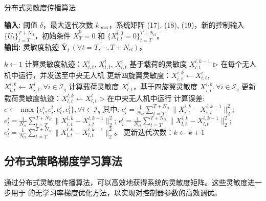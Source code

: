\documentclass[lang=chs, degree=master, blindreview=false, winfonts=true]{yanputhesis}
\begin{document}
\begin{algorithm}[h]
    \caption{分布式灵敏度传播算法}
    \label{alg:sensitivity_propagation}
    \textbf{输入:} 阈值 $\delta$，最大迭代次数 $k_{\text{max}}$，系统矩阵 (17), (18), (19)，新的控制输入 $\{\bar{U}_t\}_{t=T}^{T+N_{cl}}$，初始条件 $\bar{X}_T^0 = 0$ 和 $\{X_{l,t}^{l,0} = 0\}_{t=T}^{T+N_{cl}}$。\\
    \textbf{输出:} 灵敏度轨迹 $\bar{\mathbf{Y}}_t \, (\forall t = T, \cdots, T+N_{cl})$。

    \begin{algorithmic}[1]
    \State $k \gets 1$
                \State 计算灵敏度轨迹：$X_{i,t}^i$, $X_{i,t}^l$, $X_{l,t}^i$
                \Statex \quad 基于载荷的灵敏度 $X_{l,t}^{l,k-1}$
                \Statex \quad $\triangleright$ 在每个无人机中运行，并发送至中央无人机
            \EndFor
        \EndFor
        \State 更新四旋翼灵敏度：$X_{i,t}^{i,k} \gets X_{i,t}^i$, $X_{l,t}^{l,k} \gets X_{i,t}^l, \forall i \in \mathcal{I}_q$
            \State 计算载荷灵敏度 $X_{l,t}^l$，基于四旋翼灵敏度 $X_{i,t}^{i,k}, \forall i \in \mathcal{I}_q$
        \EndFor
        \State 更新载荷灵敏度轨迹：$X_{l,t}^{l,k} \gets X_{l,t}^l$
        \Statex \quad $\triangleright$ 在中央无人机中运行
        \State 计算误差: 
        \Statex \quad $e \gets \max \{ e_i^i, e_i^l, e_l^i, e_l^l \}, \forall i \in \mathcal{I}_q$
        \Statex \quad 其中:
        \Statex \quad $e_i^i = \frac{1}{N_{cl}} \sum_{t=T}^{T+N_{cl}} \| X_{i,t}^{i,k} - X_{i,t}^{i,k-1} \|_2^2$;
        \Statex \quad $e_l^i = \frac{1}{N_{cl}} \sum_{t=T}^{T+N_{cl}} \| X_{i,t}^{l,k} - X_{i,t}^{l,k-1} \|_2^2$;
        \Statex \quad $e_i^l = \frac{1}{N_{cl}} \sum_{t=T}^{T+N_{cl}} \| X_{l,t}^{i,k} - X_{l,t}^{i,k-1} \|_2^2$;
        \Statex \quad $e_l^l = \frac{1}{N_{cl}} \sum_{t=T}^{T+N_{cl}} \| X_{l,t}^{l,k} - X_{l,t}^{l,k-1} \|_2^2$。
        \State 更新迭代次数：$k \gets k + 1$
    \EndWhile
    \end{algorithmic}
\end{algorithm}

\subsection{分布式策略梯度学习算法}


通过分布式灵敏度传播算法，可以高效地获得系统的灵敏度矩阵。这些灵敏度进一步用于 \cite{cheng2023difftune} 的无学习率梯度优化方法，以实现对控制器参数的高效调优。
\end{document}
